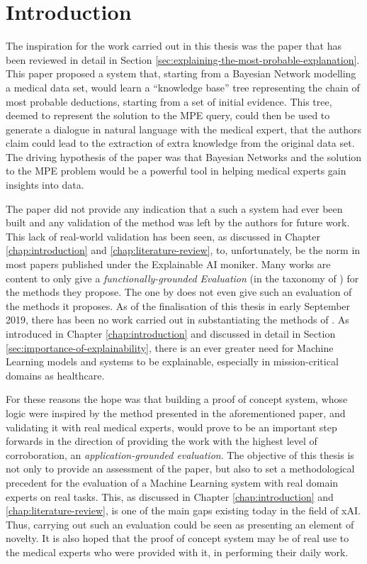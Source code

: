 \section{Introduction} \label{sec:methodology-introduction}
 The inspiration for the work carried out in this thesis was the paper \citep{Butz2018} that has been reviewed in detail in Section \ref{sec:explaining-the-most-probable-explanation}.
 This paper proposed a system that, starting from a Bayesian Network modelling a medical data set, would learn a \enquote{knowledge base} tree representing the chain of most probable deductions, starting from a set of initial evidence.
 This tree, deemed to represent the solution to the MPE query, could then be used to generate a dialogue in natural language with the medical expert, that the authors claim could lead to the extraction of extra knowledge from the original data set.  
 The driving hypothesis of the paper was that Bayesian Networks and the solution to the MPE problem would be a powerful tool in helping medical experts gain insights into data.
 
The paper did not provide any indication that a such a system had ever been built and any validation of the method was left by the authors for future work.
This lack of real-world validation has been seen, as discussed in Chapter \ref{chap:introduction} and \ref{chap:literature-review}, to, unfortunately, be the norm in most papers published under the Explainable AI moniker.
 Many works are content to only give a \textit{functionally-grounded Evaluation} (in the taxonomy of \citet{doshi2017towards}) for the methods they propose.
The one by \citet{Butz2018} does not even give such an evaluation of the methods it proposes.
 As of the finalisation of this thesis in early September 2019, there has been no work carried out in substantiating the methods of \citet{Butz2018}.
 As introduced in Chapter \ref{chap:introduction} and discussed in detail in Section \ref{sec:importance-of-explainability}, there is an ever greater need for Machine Learning models and systems to be explainable, especially in mission-critical domains as healthcare.
 
 For these reasons the hope was that building a proof of concept system, whose logic were inspired by the method presented in the aforementioned paper, and validating it with real medical experts, would prove to be an important step forwards in the direction of providing the work with the highest level of corroboration, an \textit{application-grounded evaluation}.
 The objective of this thesis is not only to provide an assessment of the paper, but also to set a methodological precedent for the evaluation of a Machine Learning system with real domain experts on real tasks.
 This, as discussed in Chapter \ref{chap:introduction} and \ref{chap:literature-review}, is one of the main gaps existing today in the field of xAI.
 Thus, carrying out such an evaluation could be seen as presenting an element of novelty.
 It is also hoped that the proof of concept system may be of real use to the medical experts who were provided with it, in performing their daily work.


